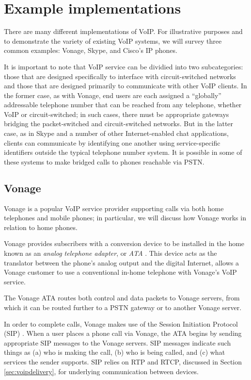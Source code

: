 \documentclass[11pt]{article}
\newcommand{\term}[1]{\textit{#1}}
\begin{document}
\section{Example implementations}

There are many different implementations of VoIP. For illustrative purposes and
to demonstrate the variety of existing VoIP systems, we will survey three
common examples: Vonage, Skype, and Cisco's IP phones.

It is important to note that VoIP service can be dividied into two
subcategories: those that are designed specifically to interface with
circuit-switched networks and those that are designed primarily to communicate
with other VoIP clients. In the former case, as with Vonage, end users are each
assigned a ``globally'' addressable telephone number that can be reached from
any telephone, whether VoIP or circuit-switched; in such cases, there must be
appropriate gateways bridging the packet-switched and circuit-switched networks.
But in the latter case, as in Skype and a number of other Internet-enabled chat
applications, clients can communicate by identifying one another using
service-specific identifiers outside the typical telephone number system. It is
possible in some of these systems to make bridged calls to phones reachable via
PSTN.

\subsection{Vonage}

Vonage is a popular VoIP service provider supporting calls via both home
telephones and mobile phones; in particular, we will discuss how Vonage works in
relation to home phones.

Vonage provides subscribers with a conversion device to be installed in the home
known as an \term{analog telephone adapter}, or \term{ATA}
\cite{vonage,howstuffworks}. This device acts as the translator between the
phone's analog output and the digital Internet, allows a Vonage customer to use
a conventional in-home telephone with Vonage's VoIP service.

The Vonage ATA routes both control and data packets to Vonage servers, from
which it can be routed further to a PSTN gateway or to another Vonage server.

In order to complete calls, Vonage makes use of the Session Initiation
Protocol (SIP) \cite{dslreports,skype_vs_vonage,ipwatchdog}. When a
user places a phone call via Vonage, the ATA begins by sending appropriate SIP
messages to the Vonage servers. SIP messages indicate such things as (a) who is
making the call, (b) who is being called, and (c) what services the sender
supports. \cite{sip} SIP relies on RTP and RTCP, discussed in
Section \ref{sec:voipdelivery}, for underlying communication between devices.
\end{document}
